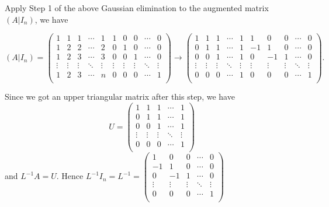 Apply Step 1 of the above Gaussian elimination to the augmented matrix $(A|I_n)$, we have

$$(A|I_n) = \left( 
    \begin{array}{ccccc|ccccc}
        1 & 1 & 1 & \cdots & 1 & 1 & 0 & 0 & \cdots & 0 \\
     1 & 2 & 2 & \cdots & 2 & 0 & 1 & 0 & \cdots & 0\\
     1 & 2 & 3 & \cdots & 3 & 0 & 0 & 1 & \cdots & 0\\
     \vdots & \vdots & \vdots & \ddots & \vdots & \vdots & \vdots & \vdots & \ddots & \vdots\\
     1 & 2 & 3 & \cdots & n & 0 & 0 & 0 & \cdots & 1\\
    \end{array}\right)
    \longrightarrow 
    \left(\begin{array}{ccccc|ccccc}
    1 & 1 & 1 & \cdots & 1 & 1 & 0 & 0 & \cdots & 0 \\
     0 & 1 & 1 & \cdots & 1 & -1 & 1 & 0 & \cdots & 0\\
     0 & 0 & 1 & \cdots & 1 & 0 & -1 & 1 & \cdots & 0\\
     \vdots & \vdots & \vdots & \ddots & \vdots & \vdots & \vdots & \vdots & \ddots & \vdots\\
     0 & 0 & 0 & \cdots & 1 & 0 & 0 & 0 & \cdots & 1\\
    \end{array}\right).$$

    Since we got an upper triangular matrix after this step, we have $$U=\begin{pmatrix}
     1 & 1 & 1 & \cdots & 1\\
     0 & 1 & 1 & \cdots & 1\\
     0 & 0 & 1 & \cdots & 1\\
     \vdots & \vdots & \vdots & \ddots & \vdots\\
     0 & 0 & 0 & \cdots & 1\\
 \end{pmatrix}$$ and $L^{-1}A=U$. Hence $L^{-1}I_n=  L^{-1}= \begin{pmatrix}
     1 & 0 & 0 & \cdots & 0 \\
     -1 & 1 & 0 & \cdots & 0\\
     0 & -1 & 1 & \cdots & 0\\
     \vdots & \vdots & \vdots & \ddots & \vdots\\
     0 & 0 & 0 & \cdots & 1\\
 \end{pmatrix}$

